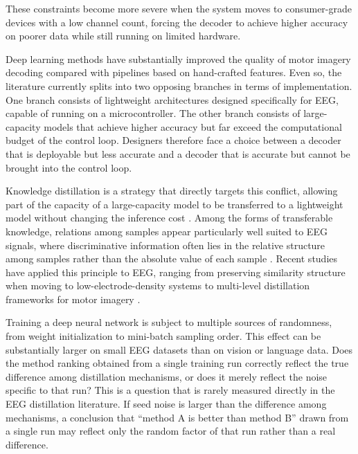 These constraints become more severe when the system moves to
consumer-grade devices with a low channel count, forcing the decoder
to achieve higher accuracy on poorer data while still running on
limited hardware.

Deep learning methods have substantially improved the quality of
motor imagery decoding compared with pipelines based on hand-crafted
features. Even so, the literature currently splits into two opposing
branches in terms of implementation. One branch consists of
lightweight architectures designed specifically for EEG, capable of
running on a microcontroller. The other branch consists of
large-capacity models that achieve higher accuracy but far exceed the
computational budget of the control loop. Designers therefore face a
choice between a decoder that is deployable but less accurate and a
decoder that is accurate but cannot be brought into the control loop.

Knowledge distillation is a strategy that directly targets this
conflict, allowing part of the capacity of a large-capacity model to
be transferred to a lightweight model without changing the inference
cost \cite{hinton2015distilling, gou2021knowledge, li2025lightweight}.
Among the forms of transferable knowledge, relations among samples
appear particularly well suited to EEG signals, where discriminative
information often lies in the relative structure among samples rather
than the absolute value of each sample \cite{park2019relational,
gou2025neighborhood}. Recent studies have applied this principle to
EEG, ranging from preserving similarity structure when moving to
low-electrode-density systems \cite{huang2024enhancing} to
multi-level distillation frameworks for motor imagery
\cite{wu2026multilevel, mai2025eegskdnet}.

Training a deep neural network is subject to multiple sources of
randomness, from weight initialization to mini-batch sampling order.
This effect can be substantially larger on small EEG datasets than on
vision or language data. Does the method ranking obtained from a
single training run correctly reflect the true difference among
distillation mechanisms, or does it merely reflect the noise specific
to that run? This is a question that is rarely measured directly in
the EEG distillation literature. If seed noise is larger than the
difference among mechanisms, a conclusion that ``method A is better
than method B'' drawn from a single run may reflect only the random
factor of that run rather than a real difference.

